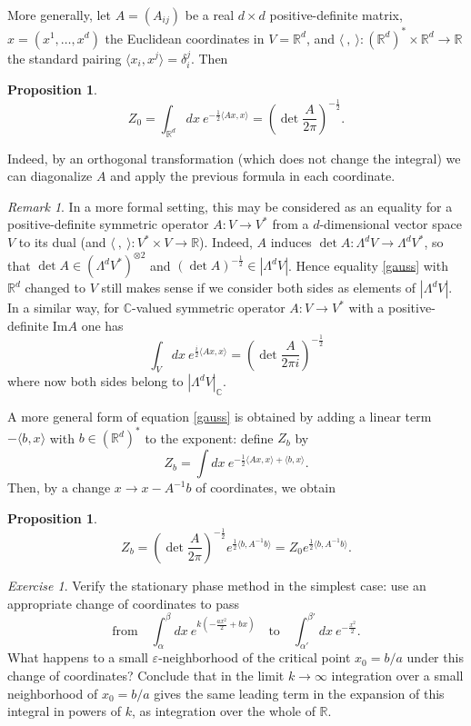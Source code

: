 \documentclass[10pt]{amsart}
\newtheorem{prop}[thm]{Proposition}
\theoremstyle{definition}
\theoremstyle{remark}
\newtheorem{rem}[thm]{Remark}
\newtheorem{exs}[thm]{Exercise}
\newcommand{\C}{\mathbb C}
\newcommand{\R}{\mathbb R}
\def\<{\langle}
\def\>{\rangle}
\newcommand{\Ga}{\alpha}
\newcommand{\Gb}{\beta}
\newcommand{\Gd}{\delta}
\newcommand{\Ge}{\varepsilon}
\newcommand{\GL}{\Lambda}
\begin{document}
More generally, let $A=(A_{ij})$ be a real $d\times d$
positive-definite matrix, $x=(x^1,\dots,x^d)$ the Euclidean
coordinates in $V=\R^d$, and $\<\ ,\ \>:(\R^d)^*\times\R^d\to\R$ the
standard pairing $\<x_i,x^j\>=\Gd_i^j$. Then

\begin{prop}
\begin{equation}\label{gauss}
Z_0=\int_{\R^d} dx\ e^{-\frac12\<Ax,x\>}=
\left(\det\frac{A}{2\pi}\right)^{-\frac12}.
\end{equation}
\end{prop}

Indeed, by an orthogonal transformation (which does not change the
integral) we can diagonalize $A$ and apply the previous formula in
each coordinate.

\begin{rem}
In a more formal setting, this may be considered as an equality
for a positive-definite symmetric operator $A:V\to V^*$ from a
$d$-dimensional vector space $V$ to its dual (and
$\<\ ,\ \>:V^*\times V\to\R$).
Indeed, $A$ induces $\det A:\GL^dV\to\GL^dV^*$, so that $\det
A\in(\GL^dV^*)^{\otimes2}$ and $(\det A)^{-\frac12}\in|\GL^dV|$.
Hence equality \eqref{gauss} with $\R^d$ changed to $V$ still
makes sense if we consider both sides as elements of $|\GL^dV|$.
In a similar way, for  $\C$-valued symmetric operator $A:V\to V^*$
with a positive-definite $\text{Im} A $ one has
$$  \displaystyle{\int_V dx\ e^{\frac{i}2\<Ax,x\>}=
    \left(\det\frac{A}{2\pi i}\right)^{-\frac12}}
$$
where now both sides belong to $|\GL^dV|_\C$.
\end{rem}

A more general form of equation \eqref{gauss} is obtained by
adding a linear term $-\<b,x\>$ with $b\in(\R^d)^*$ to the exponent:
define $Z_b$ by
\begin{equation}\label{def_Zb}
Z_b=\int dx\ e^{-\frac12\<Ax,x\>+\<b,x\>}.
\end{equation}
Then, by a change $x\to x-A^{-1}b$ of coordinates, we obtain
\begin{prop}
\begin{equation}\label{Z_b}
Z_b=\left(\det\frac{A}{2\pi}\right)^{-\frac12}e^{\frac12
\<b,A^{-1}b\>}=Z_0e^{\frac12\<b,A^{-1}b\>}.
\end{equation}
\end{prop}

\begin{exs}
\label{ex:stationary}
Verify the stationary phase method in the simplest case: use
an appropriate change of coordinates to pass
$$
               \text{from}\quad
   \int_{\Ga}^{\Gb} dx\ e^{k(-\frac{ax^2}{2}+bx)}
             \quad  \text{to}\quad
   \int_{\Ga'}^{\Gb'} dx\ e^{-\frac{x^2}{2}}.
$$
What happens to a small $\Ge$-neighborhood of the critical
point $x_0=b/a$ under this change of coordinates?
Conclude that in the limit $k\to\infty$ integration over a
small neighborhood of $x_0=b/a$ gives the same leading term
in the expansion of this integral in powers of $k$, as
integration over the whole of $\R$.
\end{exs}
\end{document}
